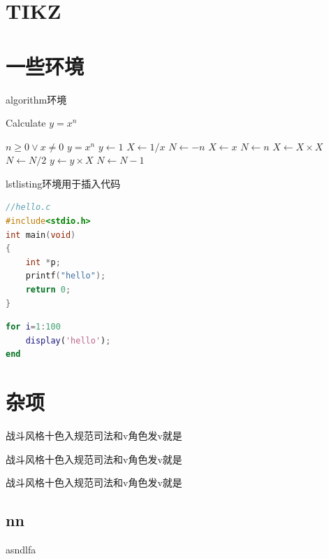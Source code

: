 \documentclass[bachelor]{XJTUthesis}
\begin{document}
\chapter{TIKZ}

\chapter{一些环境}
algorithm环境
\begin{algorithm}
    \caption{Calculate $y = x^n$}
    \label{alg1}
    \begin{algorithmic}
        \REQUIRE $n \geq 0 \vee x \neq 0$
        \ENSURE $y = x^n$
        \STATE $y \leftarrow 1$
        \STATE $X \leftarrow 1 / x$
        \STATE $N \leftarrow -n$
        \ELSE
        \STATE $X \leftarrow x$
        \STATE $N \leftarrow n$
        \ENDIF
        \STATE $X \leftarrow X \times X$
        \STATE $N \leftarrow N / 2$
        \ELSE[$N$ is odd]
        \STATE $y \leftarrow y \times X$
        \STATE $N \leftarrow N - 1$
        \ENDIF
        \ENDWHILE
    \end{algorithmic}
\end{algorithm}

lstlisting环境用于插入代码
\begin{lstlisting}[language=c++]
//hello.c
#include<stdio.h>
int main(void)
{
    int *p;
    printf("hello");
    return 0;
}
\end{lstlisting}

\begin{lstlisting}[language=matlab]
for i=1:100
    display('hello');
end
\end{lstlisting}

\chapter{杂项}

\begin{appendixs}
战斗风格十色入规范司法和v角色发v就是
\end{appendixs}

\begin{appendixs}
战斗风格十色入规范司法和v角色发v就是
\end{appendixs}

\begin{appendixs}
战斗风格十色入规范司法和v角色发v就是
\section{nn}
asndlfa
\end{appendixs}

\begin{acknowledgement}
\chaptername
\end{acknowledgement}

\end{document}
